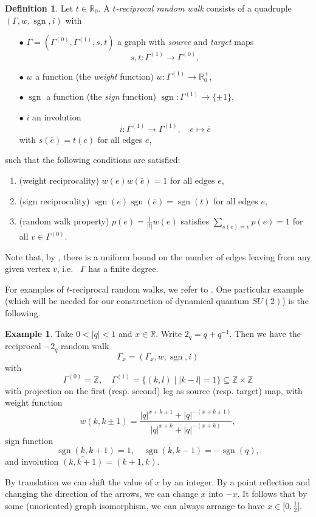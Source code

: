 \documentclass[10pt]{article}
\DeclareMathOperator{\sgn}{\mathrm{sgn}}
\newcommand{\R}{\mathbb{R}}
\newcommand{\Z}{\mathbb{Z}}
\theoremstyle{definition}
\newtheorem{Def}[Theorem]{Definition}
\newtheorem{Exa}[Theorem]{Example}
\numberwithin{equation}{section}
\begin{document}
\begin{Def} Let $t\in \R_0$. A \emph{$t$-reciprocal random walk} consists of a quadruple $(\Gamma,w,\sgn,i)$ with \begin{itemize}
\item[$\bullet$] $\Gamma=(\Gamma^{(0)},\Gamma^{(1)},s,t)$ a graph with \emph{source} and \emph{target} maps \[s,t:\Gamma^{(1)}\rightarrow \Gamma^{(0)},\]
\item[$\bullet$] $w$ a function (the \emph{weight} function) $w:\Gamma^{(1)}\rightarrow \R_0^+$,
\item[$\bullet$] $\sgn$ a function (the \emph{sign} function) $\sgn:\Gamma^{(1)}\rightarrow \{\pm 1\}$,
\item[$\bullet$] $i$ an involution \[i:\Gamma^{(1)} \rightarrow \Gamma^{(1)},\quad e\mapsto \overline{e}\] with $s(\bar{e}) = t(e)$ for all edges $e$,
\end{itemize}
such that the following conditions are satisfied:
\begin{enumerate}[label=(\arabic*)]
\item (weight reciprocality) $w(e)w(\bar{e}) = 1$ for all edges $e$,
\item (sign reciprocality) $\sgn(e)\sgn(\bar{e}) = \sgn(t)$ for all edges $e$,
\item (random walk property) $p(e) = \frac{1}{|t|}w(e)$ satisfies $\sum_{s(e)=v} p(e) = 1$ for all $v\in \Gamma^{(0)}$.
\end{enumerate}
\end{Def}


Note that, by \cite[Proposition 3.1]{DCY1}, there is a uniform bound on the number of edges leaving from any given vertex $v$, i.e.~ $\Gamma$ has a finite degree.

For examples of $t$-reciprocal random walks, we refer to \cite{DCY1}. One particular example (which will be needed for our construction of dynamical quantum $SU(2)$) is the following.

\begin{Exa}\label{ExaGraphPod} Take $0<|q|<1$ and $x\in \R$. Write $2_q = q+q^{-1}$. Then we have the reciprocal $-2_q$-random walk \[\Gamma_x =(\Gamma_x,w,\sgn,i)\] with \[ \Gamma^{(0)} = \Z,\quad \Gamma^{(1)} = \{(k,l)\mid |k-l|= 1\}\subseteq \Z\times \Z\] with projection on the first (resp. second) leg as source (resp. target) map, with weight function \[w(k,k\pm 1) = \frac{|q|^{x+k\pm 1}+|q|^{-(x+k\pm 1)}}{|q|^{x+k}+|q|^{-(x+k)}},\] sign function \[\sgn(k,k+1) = 1,\quad \sgn(k,k-1) = -\sgn(q),\] and involution $\overline{(k,k+1)} = (k+1,k)$. 

By translation we can shift the value of $x$ by an integer. By a point reflection and changing the direction of the arrows, we can change $x$ into $-x$. It follows that by some (unoriented) graph isomorphism, we can always arrange to have $x\in \lbrack 0,\frac{1}{2}\rbrack$.
\end{Exa} 
\end{document}
